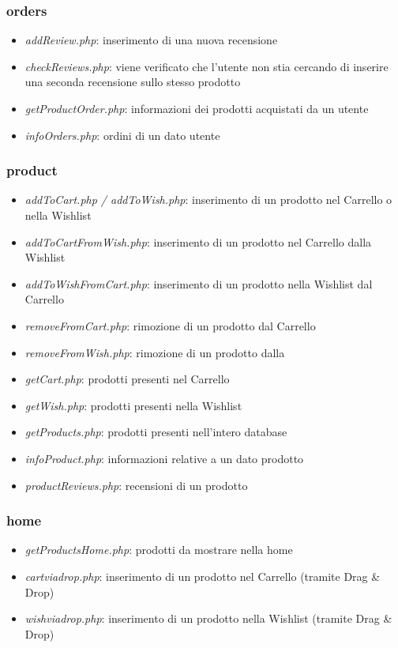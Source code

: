 \documentclass[12pt]{extarticle}
\begin{document}
\subsubsection*{orders}
\begin{itemize}
    \item \textit{addReview.php}: inserimento di una nuova recensione
    \item \textit{checkReviews.php}: viene verificato che l'utente non stia cercando di inserire una seconda
    recensione sullo stesso prodotto
    \item \textit{getProductOrder.php}: informazioni dei prodotti acquistati da un utente
    \item \textit{infoOrders.php}: ordini di un dato utente
\end{itemize}

\subsubsection*{product}
\begin{itemize}
    \item \textit{addToCart.php / addToWish.php}: inserimento di un prodotto nel Carrello o nella Wishlist
    \item \textit{addToCartFromWish.php}: inserimento di un prodotto nel Carrello dalla Wishlist
    \item \textit{addToWishFromCart.php}: inserimento di un prodotto nella Wishlist dal Carrello
    \item \textit{removeFromCart.php}: rimozione di un prodotto dal Carrello
    \item \textit{removeFromWish.php}: rimozione di un prodotto dalla
    \item \textit{getCart.php}: prodotti presenti nel Carrello
    \item \textit{getWish.php}: prodotti presenti nella Wishlist
    \item \textit{getProducts.php}: prodotti presenti nell'intero database
    \item \textit{infoProduct.php}: informazioni relative a un dato prodotto
    \item \textit{productReviews.php}: recensioni di un prodotto
\end{itemize}

\subsubsection*{home}
\begin{itemize}
    \item \textit{getProductsHome.php}: prodotti da mostrare nella home
    \item \textit{cartviadrop.php}: inserimento di un prodotto nel Carrello (tramite Drag \& Drop)
    \item \textit{wishviadrop.php}: inserimento di un prodotto nella Wishlist (tramite Drag \& Drop)
\end{itemize}
\end{document}
